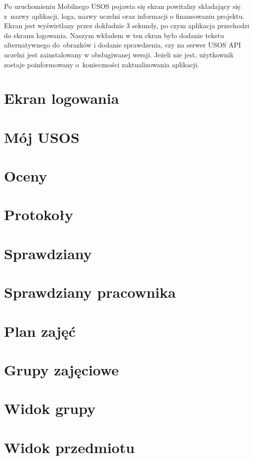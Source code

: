 \documentclass{pracamgr}
\begin{document}
Po uruchomieniu Mobilnego USOS pojawia się ekran powitalny składający się z~nazwy
aplikacji, loga, nazwy uczelni oraz informacji o finansowaniu projektu.
Ekran jest wyświetlany przez dokładnie 3 sekundy, po czym aplikacja przechodzi do
ekranu logowania. Naszym wkładem w ten ekran było dodanie tekstu alternatywnego
do~obrazków i dodanie sprawdzenia, czy na serwer USOS API uczelni jest zainstalowany
w obsługiwanej wersji. Jeżeli nie jest, użytkownik zostaje poinformowany o~konieczności
zaktualizowania aplikacji.

\section{Ekran logowania}

\section{Mój USOS}

\section{Oceny}

\section{Protokoły}

\section{Sprawdziany}

\section{Sprawdziany pracownika}

\section{Plan zajęć}

\section{Grupy zajęciowe}

\section{Widok grupy}

\section{Widok przedmiotu}
\end{document}
